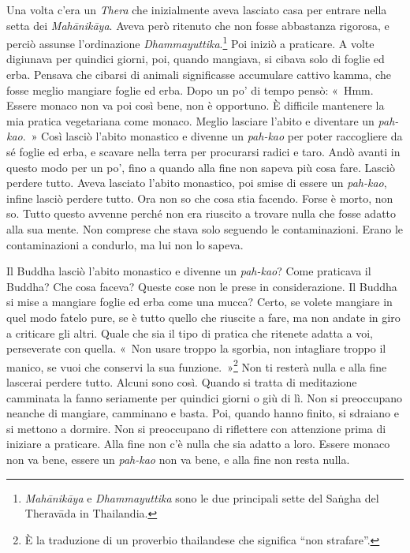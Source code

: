Una volta c'era un \emph{Thera} che inizialmente aveva lasciato casa per
entrare nella setta dei \emph{Mahānikāya}. Aveva però ritenuto che non
fosse abbastanza rigorosa, e perciò assunse l'ordinazione
\emph{Dhammayuttika}.\footnote{\emph{Mahānikāya} e
  \emph{Dhammayuttika} sono le due principali sette del Saṅgha del
  Theravāda in Thailandia.} Poi iniziò a praticare. A volte digiunava
per quindici giorni, poi, quando mangiava, si cibava solo di foglie ed
erba. Pensava che cibarsi di animali significasse accumulare cattivo
kamma, che fosse meglio mangiare foglie ed erba. Dopo un po' di
tempo pensò: «~Hmm. Essere monaco non va poi così bene, non è opportuno.
È difficile mantenere la mia pratica vegetariana come monaco. Meglio
lasciare l'abito e diventare un \emph{pah-kao}.~» Così lasciò l'abito
monastico e divenne un \emph{pah-kao} per poter raccogliere da sé foglie
ed erba, e scavare nella terra per procurarsi radici e taro. Andò avanti
in questo modo per un po', fino a quando alla fine non sapeva più cosa
fare. Lasciò perdere tutto. Aveva lasciato l'abito monastico, poi smise
di essere un \emph{pah-kao}, infine lasciò perdere tutto. Ora non so che
cosa stia facendo. Forse è morto, non so. Tutto questo avvenne perché
non era riuscito a trovare nulla che fosse adatto alla sua mente. Non
comprese che stava solo seguendo le contaminazioni. Erano le
contaminazioni a condurlo, ma lui non lo sapeva.

Il Buddha lasciò l'abito monastico e divenne un \emph{pah-kao}? Come
praticava il Buddha? Che cosa faceva? Queste cose non le prese in
considerazione. Il Buddha si mise a mangiare foglie ed erba come una
mucca? Certo, se volete mangiare in quel modo fatelo pure, se è tutto
quello che riuscite a fare, ma non andate in giro a criticare gli altri.
Quale che sia il tipo di pratica che ritenete adatta a voi, perseverate
con quella. «~Non usare troppo la sgorbia, non intagliare troppo il
manico, se vuoi che conservi la sua funzione.~»\footnote{È la traduzione
  di un proverbio thailandese che significa ``non strafare''.} Non ti
resterà nulla e alla fine lascerai perdere tutto. Alcuni sono così.
Quando si tratta di meditazione camminata la fanno seriamente per
quindici giorni o giù di lì. Non si preoccupano neanche di mangiare,
camminano e basta. Poi, quando hanno finito, si sdraiano e si mettono a
dormire. Non si preoccupano di riflettere con attenzione prima di
iniziare a praticare. Alla fine non c'è nulla che sia adatto a loro.
Essere monaco non va bene, essere un \emph{pah-kao} non va bene, e alla
fine non resta nulla.


